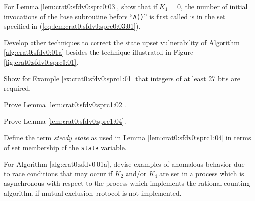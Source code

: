 \begin{vworkexercisestatement}
\label{exe:crat0:sexe0:07}
For Lemma \ref{lem:crat0:sfdv0:sprc0:03},
show that if $K_1=0$, the number of initial invocations
of the base subroutine before ``\texttt{A()}'' is first
called is in the set specified in
(\ref{eq:lem:crat0:sfdv0:sprc0:03:01}).
\end{vworkexercisestatement}
\vworkexercisefooter{}

\begin{vworkexercisestatement}
\label{exe:crat0:sexe0:08}
Develop other techniques to correct the state upset vulnerability
of Algorithm \ref{alg:crat0:sfdv0:01a} besides
the technique illustrated in 
Figure \ref{fig:crat0:sfdv0:sprc0:01}.
\end{vworkexercisestatement}
\vworkexercisefooter{}

\begin{vworkexercisestatement}
\label{exe:crat0:sexe0:09}
Show for Example \ref{ex:crat0:sfdv0:sprc1:01} that integers of at least
27 bits are required.
\end{vworkexercisestatement}
\vworkexercisefooter{}

\begin{vworkexercisestatement}
\label{exe:crat0:sexe0:10}
Prove Lemma \ref{lem:crat0:sfdv0:sprc1:02}.
\end{vworkexercisestatement}
\vworkexercisefooter{}

\begin{vworkexercisestatement}
\label{exe:crat0:sexe0:12}
Prove Lemma \ref{lem:crat0:sfdv0:sprc1:04}.
\end{vworkexercisestatement}
\vworkexercisefooter{}

\begin{vworkexercisestatement}
\label{exe:crat0:sexe0:13}
Define the term \emph{steady state} as used in
Lemma \ref{lem:crat0:sfdv0:sprc1:04} in terms of
set membership of the \texttt{state} variable.
\end{vworkexercisestatement}
\vworkexercisefooter{}

\begin{vworkexercisestatement}
\label{exe:crat0:sexe0:14}
For Algorithm \ref{alg:crat0:sfdv0:01a}, devise examples of anomalous behavior due to
race conditions that may occur if $K_2$ and/or $K_4$ are set in a process
which is asynchronous with respect to the process which implements the
rational counting algorithm if mutual exclusion protocol is not 
implemented.
\end{vworkexercisestatement}
\vworkexercisefooter{}


